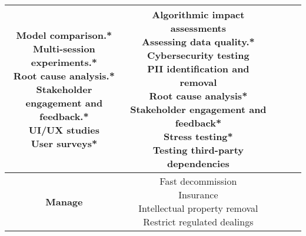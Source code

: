 \documentclass[fleqn]{article}
\begin{document}
\begin{landscape}
\begin{table}[H]
\begin{tabular}{|c|c|c|c|c|}
{			\textbullet\hspace{3pt} Model comparison.* \\
			\textbullet\hspace{3pt} Multi-session experiments.* \\	
			\textbullet\hspace{3pt} Root cause analysis.* \\			
			\textbullet\hspace{3pt} Stakeholder engagement and \\\hspace{10pt}feedback.*	\\		
			\textbullet\hspace{3pt} UI/UX studies \\			
			\textbullet\hspace{3pt} User surveys*\\  
		} 
		& 	
		\makecell[l]{
			\textbullet\hspace{3pt} Algorithmic impact assessments\\  	
			\textbullet\hspace{3pt} Assessing data quality.* \\
			\textbullet\hspace{3pt} Cybersecurity testing\\  
			\textbullet\hspace{3pt} PII identification and removal\\  		
			\textbullet\hspace{3pt} Root cause analysis*\\  	
			\textbullet\hspace{3pt} Stakeholder engagement and feedback*\\  	
			\textbullet\hspace{3pt} Stress testing*\\  	
			\textbullet\hspace{3pt} Testing third-party dependencies \\
		}
		\\
		\hline		
		\textbf{Manage} &  \makecell[l]{
			\textbullet\hspace{3pt} Fast decommission \\ 	
			\textbullet\hspace{3pt} Insurance \\ 	
			\textbullet\hspace{3pt} Intellectual property removal \\ 			
			\textbullet\hspace{3pt} Restrict regulated dealings \\ 	
}
\end{tabular}
\end{table}
\end{landscape}
\end{document}
